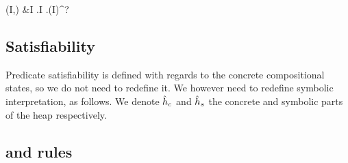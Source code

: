 \begin{breakalign*}
	\SplitPMap(I,\mmdl) & I \finmap \mmdl.\Sigma \times I \finmap\mmdl.\Sigma \times \pset(I)^?
\end{breakalign*}

\subsection{Satisfiability}

Predicate satisfiability is defined with regards to the concrete compositional states, so we do not need to redefine it. We however need to redefine symbolic interpretation, as follows. We denote $\sym h_c$ and $\sym h_s$ the concrete and symbolic parts of the heap respectively.
\begin{mathpar}
\end{mathpar}

\subsection{ and  rules}

